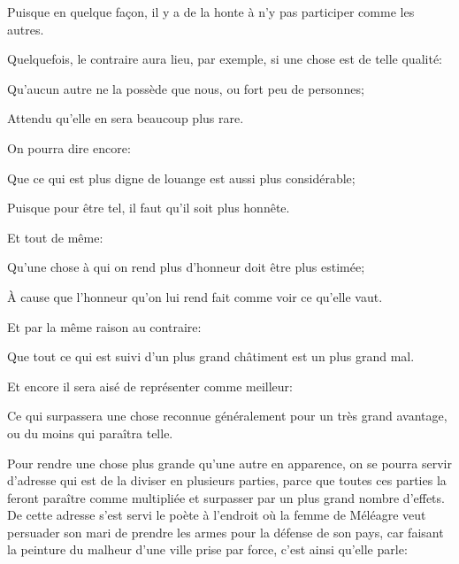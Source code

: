 Puisque en quelque façon, il y a de la honte à n'y pas participer comme les autres.

Quelquefois, le contraire aura lieu, par exemple, si une chose est de telle qualité:

\begin{lieu}
	Qu'aucun autre ne la possède que nous, ou fort peu de personnes;
\end{lieu}

Attendu qu'elle en sera beaucoup plus rare.

\bigbreak

On pourra dire encore:

\begin{lieu}
	Que ce qui est plus digne de louange est aussi plus considérable;
\end{lieu}

Puisque pour être tel, il faut qu'il soit plus honnête.

\bigbreak

Et tout de même:

\begin{lieu}
	Qu'une chose à qui on rend plus d'honneur doit être plus estimée;
\end{lieu}

À cause que l'honneur qu'on lui rend fait comme voir ce qu'elle vaut.

Et par la même raison au contraire:

\begin{lieu}
	Que tout ce qui est suivi d'un plus grand châtiment est un plus grand mal.
\end{lieu}

\bigbreak

Et encore il sera aisé de représenter comme meilleur:

\begin{lieu}
	Ce qui surpassera une chose reconnue généralement pour un très grand avantage, ou du moins qui paraîtra telle.
\end{lieu}

\bigbreak

Pour rendre une chose plus grande qu'une autre en apparence, on se pourra servir d'adresse qui est de la diviser en
plusieurs parties, parce que toutes ces parties la feront paraître comme multipliée et surpasser par un plus grand
nombre d'effets. De cette adresse s'est servi le poète à l'endroit où la femme de Méléagre veut persuader son mari de
prendre les armes pour la défense de son pays, car faisant la peinture du malheur d'une ville prise par force, c'est
ainsi qu'elle parle:


